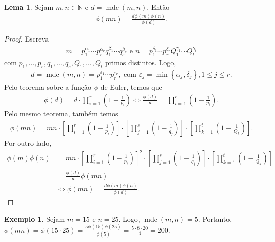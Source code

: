 \documentclass[a4paper,11pt,twoside, leqno]{article}
\DeclareMathOperator{\mdc}{mdc}
\theoremstyle{definition}
\newtheorem{lemma}[theorem]{Lema}
\newtheorem*{example}{Exemplo}
\begin{document}
\begin{lemma}
	\label{lema 57}
	Sejam $m,n\in\mathbb{N}$ e $d = \mdc(m,n)$. Então
	\begin{align*}
	\phi(mn) = \frac{d\phi(m)\phi(n)}{\phi(d)}.
	\end{align*}
\end{lemma}
\begin{proof}
	Escreva 
	\begin{align*}
	m = p_1^{\alpha_1}\cdots p_r^{\alpha_r}q_1^{\beta_1}\cdots q_s^{\beta_s} \text{ e } n = p_1^{\delta_1}\cdots p_r^{\delta_r}Q_1^{\gamma_1}\cdots Q_t^{\gamma_t}
	\end{align*}
	com $p_1, \dots, p_r, q_1, \dots, q_s, Q_1, \dots, Q_t$ primos distintos. Logo,
	\begin{align*}
	d = \mdc(m,n) = p_1^{\varepsilon_1}\cdots p_r^{\varepsilon_r}, \text{ com } \varepsilon_j = \min\left\{ \alpha_j, \delta_j \right\}, 1\leq j\leq r.
	\end{align*}
	Pelo teorema sobre a função $\phi$ de Euler, temos que
	\begin{align*}
	\phi(d) = d\cdot\prod_{i=1}^{r}\left( 1 - \frac{1}{p_i} \right) \Leftrightarrow \frac{\phi(d)}{d} = \prod_{i=1}^{r}\left( 1 - \frac{1}{p_i} \right).
	\end{align*}
	Pelo mesmo teorema, também temos
	\begin{align*}
	\phi(mn) = mn\cdot\left[ \prod_{i=1}^{r}\left( 1 - \frac{1}{p_i} \right) \right]\cdot\left[ \prod_{j=1}^{s}\left( 1 - \frac{1}{q_j} \right) \right]\cdot\left[ \prod_{k=1}^{t}\left( 1 - \frac{1}{Q_k} \right) \right].
	\end{align*}
	Por outro lado, 
	\begin{align*}
	\phi(m)\phi(n) &= mn\cdot\left[ \prod_{i=1}^{r}\left( 1 - \frac{1}{p_i} \right) \right]^2\cdot \left[ \prod_{j=1}^{s}\left( 1 - \frac{1}{q_j} \right) \right]\cdot\left[ \prod_{k=1}^{t}\left( 1 - \frac{1}{Q_k} \right) \right] \\
	&= \frac{\phi(d)}{d}\phi(mn) \\
	&\Leftrightarrow \phi(mn) = \frac{d\phi(m)\phi(n)}{\phi(d)}.
	\end{align*}
\end{proof}
\begin{example}
	Sejam $m=15$ e $n=25$. Logo, $\mdc(m,n) = 5$. Portanto, $\phi(mn) = \phi(15\cdot 25) = \displaystyle{\frac{5\phi(15)\phi(25)}{\phi(5)} = \frac{5\cdot 8\cdot 20}{4} = 200}.$
\end{example}
\end{document}
